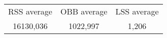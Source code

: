 \begin{tabular}{c|c|c}\\ 
RSS average & OBB average & LSS average\\ 
16130,036 & 1022,997 & 1,206\\ 
\end{tabular}